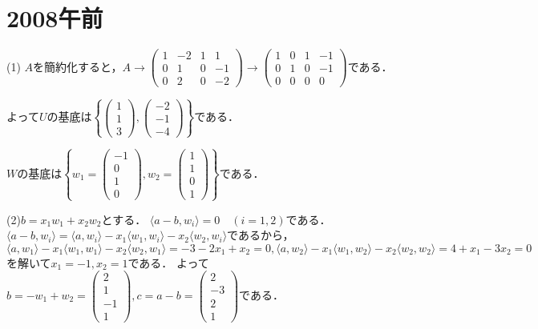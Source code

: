 \documentclass[
		book,
		head_space=20mm,
		foot_space=20mm,
		gutter=10mm,
		line_length=190mm
]{jlreq}
\begin{document}
\section{2008午前}
(1)
$A$を簡約化すると，$A\rightarrow \begin{pmatrix}
1&-2&1&1\\
0&1&0&-1\\
0&2&0&-2
\end{pmatrix}\rightarrow \begin{pmatrix}
1&0&1&-1\\
0&1&0&-1\\
0&0&0&0
\end{pmatrix}$である．

よって$U$の基底は$\left\{ \begin{pmatrix}
1\\1\\3
\end{pmatrix},\begin{pmatrix}
-2\\-1\\-4
\end{pmatrix} \right\}$である．

$W$の基底は$\left\{ w_1=\begin{pmatrix}
-1\\0\\1\\0
\end{pmatrix},w_2=\begin{pmatrix}
1\\1\\0\\1
\end{pmatrix} \right\}$である．

(2)$b=x_1w_1+x_2w_2$とする．
$\langle a-b,w_i\rangle=0\quad(i=1,2)$である．
$\langle a-b,w_i\rangle=\langle a,w_i\rangle-x_1\langle w_1,w_i\rangle-x_2\langle w_2,w_i\rangle$であるから，
$\langle a,w_1\rangle-x_1\langle w_1,w_1\rangle-x_2\langle w_2,w_1\rangle=-3-2x_1+x_2=0,\langle a,w_2\rangle-x_1\langle w_1,w_2\rangle-x_2\langle w_2,w_2\rangle=4+x_1-3x_2=0$を解いて$x_1=-1,x_2=1$である．
よって$b=-w_1+w_2=\begin{pmatrix}
2\\1\\-1\\1
\end{pmatrix},c=a-b=\begin{pmatrix}
2\\-3\\2\\1
\end{pmatrix}$である．
\end{document}
